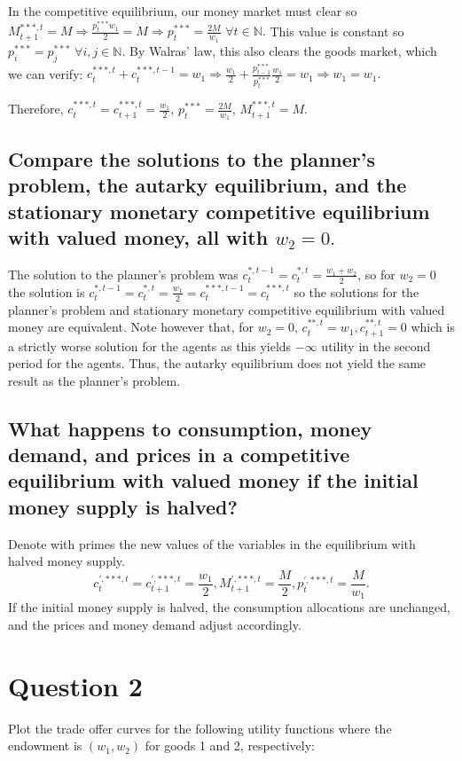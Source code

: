 \documentclass[11pt]{article} %
\begin{document}
In the competitive equilibrium, our money market must clear so $M_{t+1}^{***,t} = M \Rightarrow \frac{p_t^{***} w_1}{2} = M \Rightarrow p_t^{***} = \frac{2M}{w_1}$ $\forall t \in \mathbb{N}.$ This value is constant so $p_i^{***} = p_j^{***}$ $\forall i,j \in \mathbb{N}.$ By Walras' law, this also clears the goods market, which we can verify: $c_t^{***,t} + c_t^{***,t-1} = w_1 \Rightarrow \frac{w_1}{2} + \frac{p_{t-1}^{***}}{p_t^{***}}\frac{w_1}{2} = w_1 \Rightarrow w_1 = w_1.$

Therefore, $c_t^{***,t} = c_{t+1}^{***,t} = \frac{w_1}{2}$, $p_t^{***} =  \frac{2M}{w_1}$, $M_{t+1}^{***,t} = M.$

\subsection{Compare the solutions to the planner's problem, the autarky equilibrium, and the stationary monetary competitive equilibrium with valued money, all with $w_2 = 0.$}
The solution to the planner's problem was  $c_t^{*,t-1} = c_t^{*,t} = \frac{w_1 + w_2}{2}$, so for $w_2 = 0$ the solution is $c_t^{*,t-1} = c_t^{*,t} = \frac{w_1}{2} = c_t^{***,t-1} = c_t^{***,t}$ so the solutions for the planner's problem and stationary monetary competitive equilibrium with valued money are equivalent. Note however that, for $w_2 = 0$, $c_t^{**,t} = w_1, c_{t+1}^{**,t} = 0$ which is a strictly worse solution for the agents as this yields $-\infty$ utility in the second period for the agents. Thus, the autarky equilibrium does not yield the same result as the planner's problem.

\subsection{What happens to consumption, money demand, and prices in a competitive equilibrium with valued money if the initial money supply is halved?}
Denote with primes the new values of the variables in the equilibrium with halved money supply.
\begin{equation*}
c_t^{',***,t} = c_{t+1}^{',***,t} = \frac{w_1}{2}, M_{t+1}^{',***,t} = \frac{M}{2}, p_t^{',***,t} =  \frac{M}{w_1}.
\end{equation*}
If the initial money supply is halved, the consumption allocations are unchanged, and the prices and money demand adjust accordingly.

\section{Question 2}
Plot the trade offer curves for the following utility functions where the endowment is $(w_1,w_2)$ for goods 1 and 2, respectively:
\end{document}
